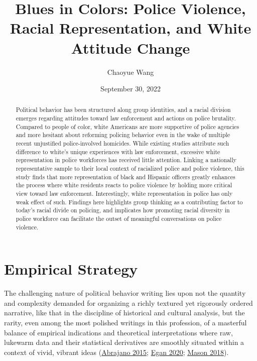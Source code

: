 \documentclass[
  11pt,
]{article}
\title{\textbf{Blues in Colors: Police Violence, Racial Representation,
and White Attitude Change}}
\author{Chaoyue Wang}
\date{September 30, 2022}
\begin{document}
\maketitle
\begin{abstract}
Political behavior has been structured along group identities, and a
racial division emerges regarding attitudes toward law enforcement and
actions on police brutality. Compared to people of color, white
Americans are more supportive of police agencies and more hesitant about
reforming policing behavior even in the wake of multiple recent
unjustified police-involved homicides. While existing studies attribute
such difference to white's unique experiences with law enforcement,
excessive white representation in police workforces has received little
attention. Linking a nationally representative sample to their local
context of racialized police and police violence, this study finds that
more representation of black and Hispanic officers greatly enhances the
process where white residents reacts to police violence by holding more
critical view toward law enforcement. Interestingly, white
representation in police has only weak effect of such. Findings here
highlights group thinking as a contributing factor to today's racial
divide on policing, and implicates how promoting racial diversity in
police workforce can facilitate the outset of meaningful conversations
on police violence.
\end{abstract}

\ifdefined\Shaded\renewenvironment{Shaded}{\begin{tcolorbox}[breakable, frame hidden, boxrule=0pt, interior hidden, borderline west={3pt}{0pt}{shadecolor}, enhanced, sharp corners]}{\end{tcolorbox}}\fi

\hypertarget{empirical-strategy}{%
\section{Empirical Strategy}\label{empirical-strategy}}

The challenging nature of political behavior writing lies upon not the
quantity and complexity demanded for organizing a richly textured yet
rigorously ordered narrative, like that in the discipline of historical
and cultural analysis, but the rarity, even among the most polished
writings in this profession, of a masterful balance of empirical
indications and theoretical interpretations where raw, lukewarm data and
their statistical derivatives are smoothly situated within a context of
vivid, vibrant ideas (\protect\hyperlink{ref-abrajano2015}{Abrajano
2015}; \protect\hyperlink{ref-egan2020}{Egan 2020};
\protect\hyperlink{ref-mason2018}{Mason 2018}).
\end{document}
